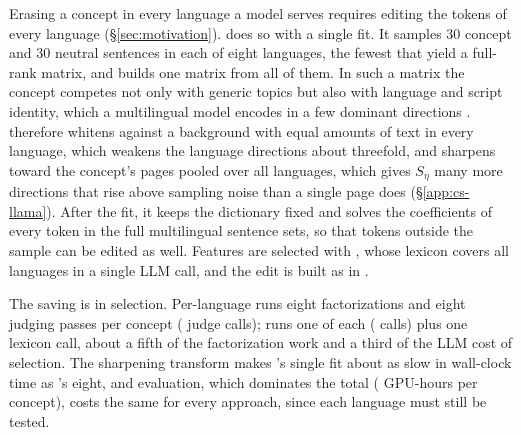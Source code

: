 Erasing a concept in every language a model serves requires editing the tokens of every language (\S\ref{sec:motivation}).
\cinder{} does so with a single fit.
It samples 30 concept and 30 neutral sentences in each of eight languages, the fewest that yield a full-rank matrix, and builds one matrix from all of them.
In such a matrix the concept competes not only with generic topics but also with language and script identity, which a multilingual model encodes in a few dominant directions \citep{chang2022geometry,libovicky2020language}.
\cinder{} therefore whitens against a background with equal amounts of text in every language, which weakens the language directions about threefold, and sharpens toward the concept's pages pooled over all languages, which gives $S_\eta$ many more directions that rise above sampling noise than a single page does (\S\ref{app:cs-llama}).
After the fit, it keeps the dictionary fixed and solves the coefficients of every token in the full multilingual sentence sets, so that tokens outside the sample can be edited as well.
Features are selected with \twj{}, whose lexicon covers all languages in a single LLM call, and the edit is built as in \cinderz{}.

The saving is in selection.
Per-language \ember{} runs eight factorizations and eight judging passes per concept ( judge calls); \cinder{} runs one of each ( calls) plus one lexicon call, about a fifth of the factorization work and a third of the LLM cost of selection.
The sharpening transform makes \cinder{}'s single fit about as slow in wall-clock time as \ember{}'s eight, and evaluation, which dominates the total ( GPU-hours per concept), costs the same for every approach, since each language must still be tested.
